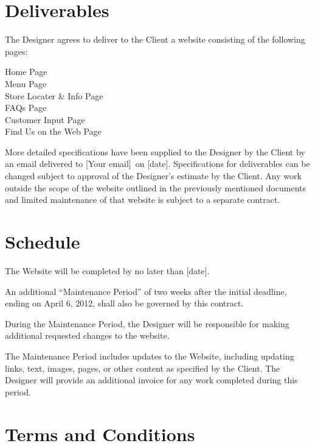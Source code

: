 \documentclass[usletter,12pt]{article} %
\newcommand{\YourEmail}{[Your email]}
\newcommand{\DeliveryDate}{[date]}
\newcommand{\CompletionDate}{[date]}
\begin{document}
\section{Deliverables}

The Designer agrees to deliver to the Client a website consisting of the following pages:

Home Page\\
Menu Page\\
Store Locater \& Info Page\\
FAQs Page\\
Customer Input Page\\
Find Us on the Web Page

More detailed specifications have been supplied to the Designer by the Client by an email delivered to \YourEmail~on \DeliveryDate. Specifications for deliverables can be changed subject to approval of the Designer's estimate by the Client. Any work outside the scope of the website outlined in the previously mentioned documents and limited maintenance of that website is subject to a separate contract.


\section{Schedule}

The Website will be completed by no later than \CompletionDate.

An additional ``Maintenance Period'' of two weeks after the initial deadline, ending on April 6, 2012, shall also be governed by this contract.

During the Maintenance Period, the Designer will be responsible for making additional requested changes to the website.

The Maintenance Period includes updates to the Website, including updating links, text, images, pages, or other content as specified by the Client. The Designer will provide an additional invoice for any work completed during this period.


\section{Terms and Conditions}
\end{document}
